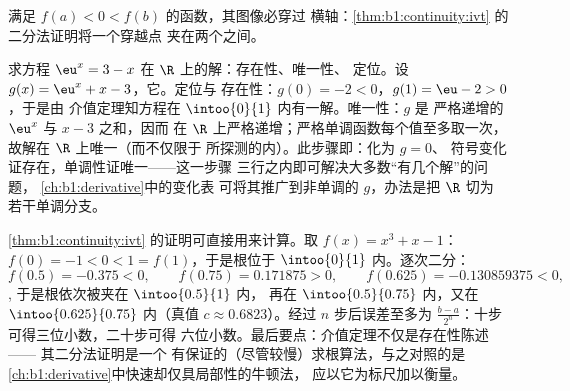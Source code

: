 \begin{omfigure}

{\small 满足 $f(a) < 0 < f(b)$ 的函数，其图像必穿过
横轴：\cref{thm:b1:continuity:ivt} 的二分法证明将一个穿越点
夹在两个之间。}
\end{omfigure}

\begin{example}[一个方程的完整步骤]\label{ex:b1:continuity:protocol}
求方程 $\eu^x = 3 - x$ 在 $\R$ 上的解：存在性、唯一性、
定位。设 $g(x) = \eu^x + x - 3$，它。定位与
存在性：$g(0) = -2 < 0$，$g(1) = \eu - 2 > 0$，于是由
介值定理知方程在
$\intoo{0}{1}$ 内有一解。唯一性：$g$ 是
严格递增的 $\eu^x$ 与 $x - 3$ 之和，因而
在 $\R$ 上严格递增；严格单调函数每个值至多取一次，
故解在 $\R$ 上唯一（而不仅限于
所探测的内）。此步骤即：化为 $g = 0$、
符号变化证存在，单调性证唯一——这一步骤
三行之内即可解决大多数“有几个解”的问题，
\cref{ch:b1:derivative}中的变化表
可将其推广到非单调的 $g$，办法是把 $\R$ 切为
若干单调分支。
\end{example}

\begin{example}[作为算法的二分法]\label{ex:b1:continuity:dichotomy}
\cref{thm:b1:continuity:ivt} 的证明可直接用来计算。取 $f(x) =
x^3 + x - 1$：$f(0) = -1 < 0 < 1 = f(1)$，于是根位于
$\intoo{0}{1}$ 内。逐次二分：
\[
f(0.5) = -0.375 < 0, \qquad
f(0.75) = 0.171875 > 0, \qquad
f(0.625) = -0.130859375 < 0 ,
\],
于是根依次被夹在 $\intoo{0.5}{1}$ 内，
再在 $\intoo{0.5}{0.75}$ 内，又在 $\intoo{0.625}{0.75}$ 内（真值
$c \approx 0.6823$）。经过 $n$ 步后误差至多为
$\frac{b - a}{2^n}$：十步可得三位小数，二十步可得
六位小数。最后要点：介值定理不仅是存在性陈述——
其二分法证明是一个
有保证的（尽管较慢）求根算法，与之对照的是
\cref{ch:b1:derivative}中快速却仅具局部性的牛顿法，
应以它为标尺加以衡量。
\end{example}


